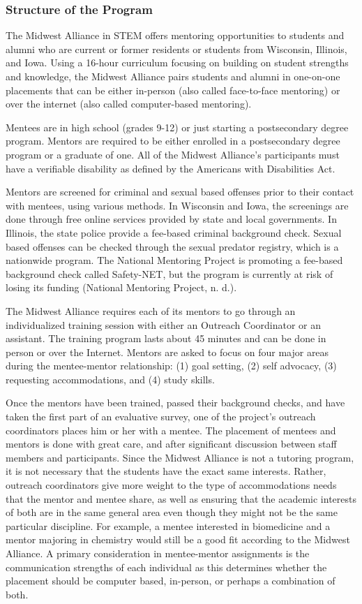 \documentclass[11.5pt]{sig-alternate} %
\begin{document}
\begin{large}
\subsubsection*{Structure of the Program}
The Midwest Alliance in STEM offers mentoring opportunities to students and alumni who are current or former residents or students from Wisconsin, Illinois, and Iowa. Using a 16-hour curriculum focusing on building on student strengths and knowledge, the Midwest Alliance pairs students and alumni in one-on-one placements that can be either in-person (also called face-to-face mentoring) or over the internet (also called computer-based mentoring).

Mentees are in high school (grades 9-12) or just starting a postsecondary degree program. Mentors are required to be either enrolled in a postsecondary degree program or a graduate of one. All of the Midwest Alliance's participants must have a verifiable disability as defined by the Americans with Disabilities Act.

Mentors are screened for criminal and sexual based offenses prior to their contact with mentees, using various methods. In Wisconsin and Iowa, the screenings are done through free online services provided by state and local governments. In Illinois, the state police provide a fee-based criminal background check. Sexual based offenses can be checked through the sexual predator registry, which is a nationwide program. The National Mentoring Project is promoting a fee-based background check called Safety-NET, but the program is currently at risk of losing its funding (National Mentoring Project, n. d.).

The Midwest Alliance requires each of its mentors to go through an individualized training session with either an Outreach Coordinator or an assistant. The training program lasts about 45 minutes and can be done in person or over the Internet. Mentors are asked to focus on four major areas during the mentee-mentor relationship: (1) goal setting, (2) self advocacy, (3) requesting accommodations, and (4) study skills.

Once the mentors have been trained, passed their background checks, and have taken the first part of an evaluative survey, one of the project's outreach coordinators places him or her with a mentee.
The placement of mentees and mentors is done with great care, and after significant discussion between staff members and participants. Since the Midwest Alliance is not a tutoring program, it is not necessary that the students have the exact same interests. Rather, outreach coordinators give more weight to the type of accommodations needs that the mentor and mentee share, as well as ensuring that the academic interests of both are in the same general area even though they might not be the same particular discipline. For example, a mentee interested in biomedicine and a mentor majoring in chemistry would still be a good fit according to the Midwest Alliance. A primary consideration in mentee-mentor assignments is the communication strengths of each individual as this determines whether the placement should be computer based, in-person, or perhaps a combination of both.


\end{large}
\end{document}
